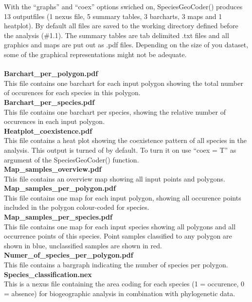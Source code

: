 \documentclass[a4paper,titlepage,11pt]{scrreprt}
\begin{document}
With the ``graphs'' and ``coex'' options swiched on, SpeciesGeoCoder() produces 13 outputfiles (1 nexus file, 5 summary tables, 3 barcharts, 3 maps and 1 heatplot). By default all files are saved to the working directory defined before the analysis (\#1.1). The summary tables are tab delimited .txt files and all graphics and maps are put out as .pdf files. Depending on the size of you dataset, some of the graphical representations might not be adequate. \\
\\
\textbf{Barchart\_per\_polygon.pdf}\\
This file contains one barchart for each input polygon showing the total number of occurences for each species in this polygon.\\
\textbf{Barchart\_per\_species.pdf}\\
This file contains one barchart per species, showing the relative number of occurences in each input polygon.\\
\textbf{Heatplot\_coexistence.pdf}\\
This file contains a heat plot showing the coexistence pattern of all species in the analysis. This output is turned of by default. To turn it on use  ``coex = T'' as argument of the SpeciesGeoCoder() function.\\
\textbf{Map\_samples\_overview.pdf}\\
This file contains  an overview map showing all input points and polygons.\\
\textbf{Map\_samples\_per\_polygon.pdf}\\
This file contains one map for each input polygon, showing all occurence points included in the polygon colour-coded for species.\\
\textbf{Map\_samples\_per\_species.pdf}\\
This file contains one map  for each input species showing all polygons and all occurrence points of this species. Point samples classified to any polygon are shown in blue, unclassified samples are shown in red.\\
\textbf{Numer\_of\_species\_per\_polygon.pdf}\\
This file contains a bargraph indicating the number of species per polygon.\\
\textbf{Species\_classification.nex}\\
This is a nexus file containing the area coding for each species (1 = occurence, 0 = absence) for biogeographic analysis in combination with phylogenetic data.\\
\end{document}
